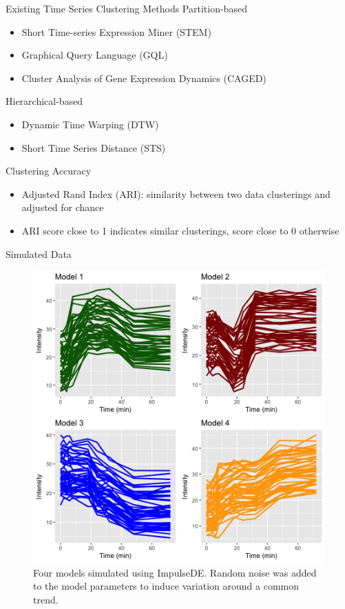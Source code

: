 \documentclass[10pt]{beamer}
\begin{document}
\begin{frame}{Existing Time Series Clustering Methods}
Partition-based
\begin{itemize}
\item Short Time-series Expression Miner (STEM)
\item Graphical Query Language (GQL)
\item Cluster Analysis of Gene Expression Dynamics (CAGED)
\end{itemize}

Hierarchical-based
\begin{itemize}
\item Dynamic Time Warping (DTW)
\item Short Time Series Distance (STS)
\end{itemize}
\end{frame}


\begin{frame}{Clustering Accuracy}
\begin{itemize}
\item  Adjusted Rand Index (ARI): similarity between two data clusterings and adjusted for chance 
\item  ARI score close to 1 indicates similar clusterings, score close to 0 otherwise
\end{itemize}
\end{frame}


\begin{frame}{Simulated Data}
\begin{figure}
     \includegraphics[width=0.65\linewidth]{Simulation_plot.png}
      \caption{Four models simulated using ImpulseDE. Random noise was added to the model parameters to induce variation around a common trend.}
       \label{fig:simdata}
    \end{figure}
\end{frame}
\end{document}
